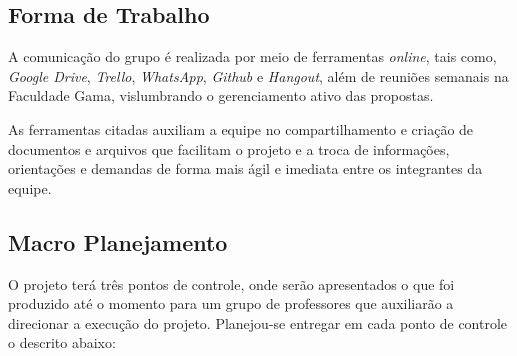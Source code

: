 \subsection{Forma de Trabalho}
A comunicação  do grupo é realizada por meio de ferramentas \textit{online}, tais como, \textit{Google Drive}, \textit{Trello}, \textit{WhatsApp}, \textit{Github} e \textit{Hangout}, além de reuniões semanais na Faculdade Gama, vislumbrando o gerenciamento ativo das propostas.
\par As ferramentas citadas auxiliam a equipe no compartilhamento e criação de documentos e arquivos que facilitam o projeto e a troca de informações, orientações e demandas de forma mais ágil e imediata entre os integrantes da equipe.

\subsection{Macro Planejamento}
O projeto terá três pontos de controle, onde serão apresentados o que foi produzido até o momento para um grupo de professores que auxiliarão a direcionar a execução do projeto. Planejou-se entregar em cada ponto de controle o descrito abaixo:

